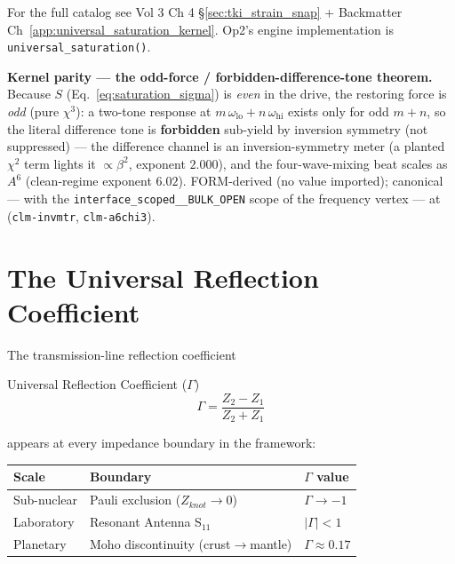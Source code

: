 For the full catalog see Vol 3 Ch 4 \S\ref{sec:tki_strain_snap} +
Backmatter Ch~\ref{app:universal_saturation_kernel}. Op2's engine
implementation is 
\texttt{universal\_saturation()}.

\medskip\noindent\textbf{Kernel parity --- the odd-force / forbidden-difference-tone theorem.}
Because $S$ (Eq.~\ref{eq:saturation_sigma}) is \emph{even} in the drive, the restoring
force is \emph{odd} (pure $\chi^3$): a two-tone response at
$m\,\omega_{\text{lo}} + n\,\omega_{\text{hi}}$ exists only for odd $m+n$, so the literal
difference tone is \textbf{forbidden} sub-yield by inversion symmetry (not suppressed) ---
the difference channel is an inversion-symmetry meter (a planted $\chi^2$ term lights it
$\propto\beta^2$, exponent $2.000$), and the four-wave-mixing beat scales as $A^6$
(clean-regime exponent $6.02$). FORM-derived (no value imported); canonical --- with the
\texttt{interface\_scoped\_\_BULK\_OPEN} scope of the frequency vertex --- at
(\texttt{clm-invmtr}, \texttt{clm-a6chi3}).

\section{The Universal Reflection Coefficient}
\label{sec:universal_gamma}

The transmission-line reflection coefficient
\begin{resultbox}{Universal Reflection Coefficient ($\Gamma$)}
\begin{equation}
    \Gamma = \frac{Z_2 - Z_1}{Z_2 + Z_1}
    \label{eq:universal_gamma}
\end{equation}
\end{resultbox}
appears at every impedance boundary in the framework:

\begin{center}
\small
\begin{tabularx}{\textwidth}{@{}l l X@{}}
\toprule
\textbf{Scale} & \textbf{Boundary} & \textbf{$\Gamma$ value} \\
\midrule
Sub-nuclear & Pauli exclusion ($Z_{knot} \to 0$) & $\Gamma \to -1$\gammaundeclared{} \\
Laboratory  & Resonant Antenna S$_{11}$ & $|\Gamma| < 1$ \\
Planetary   & Moho discontinuity (crust$\to$mantle) & $\Gamma \approx 0.17$ \\
\bottomrule
\end{tabularx}
\end{center}

